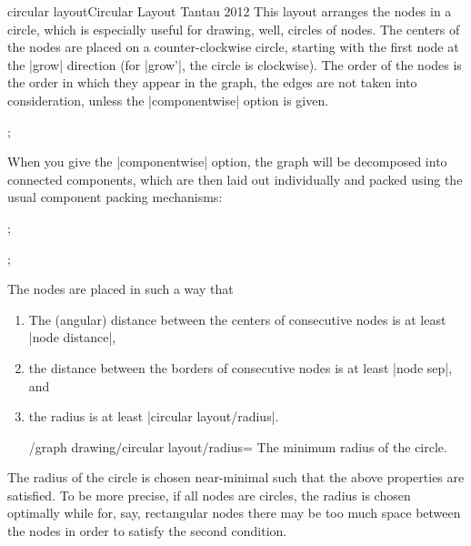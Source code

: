 \begin{gdalgorithm}{circular layout}{Circular Layout Tantau 2012}
  This layout arranges the nodes in a circle, which is especially
  useful for drawing, well, circles of nodes. The centers of the nodes
  are placed on a counter-clockwise circle, starting with the first
  node at the |grow| direction (for |grow'|, the circle is
  clockwise). The order of the nodes is the order in which they appear
  in the graph, the edges are not taken into consideration, unless the
  |componentwise| option is given.

\begin{codeexample}[]
\tikz[>=spaced stealth']
  ;    
\end{codeexample}

  When you give the |componentwise| option, the graph will be
  decomposed into connected components, which are then laid out
  individually and packed using the usual component packing
  mechanisms:
  
\begin{codeexample}[]
\tikz {};    
\end{codeexample}
\begin{codeexample}[]
\tikz {};    
\end{codeexample}

  The nodes are placed in such a way that
  \begin{enumerate}
  \item The (angular) distance between the centers of consecutive
    nodes is at least  |node distance|,
  \item the distance between the borders of consecutive nodes is at
    least |node sep|, and
  \item the radius is at least |circular layout/radius|.
    \begin{key}{/graph drawing/circular layout/radius=}
      The minimum radius of the circle.
    \end{key}
  \end{enumerate}
  The radius of the circle is chosen near-minimal such that the above
  properties are satisfied. To be more precise, if all nodes are
  circles, the radius is chosen optimally while for, say, rectangular
  nodes there may be too much space between the nodes in order to
  satisfy the second condition.


\end{gdalgorithm}
